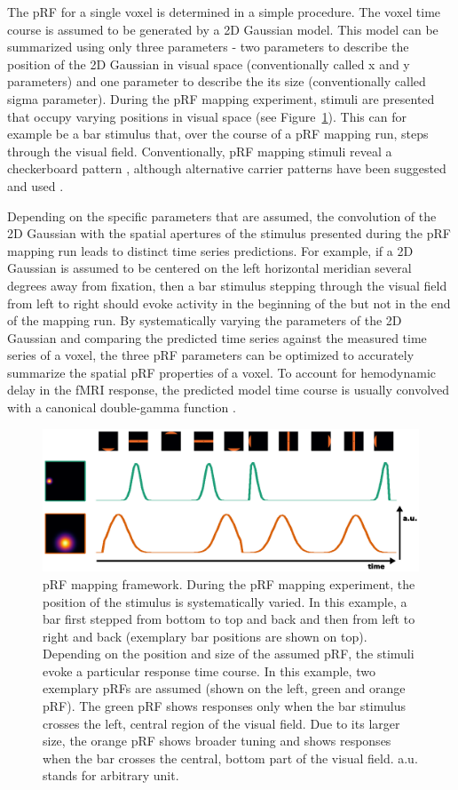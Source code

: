 The pRF for a single voxel is determined in a simple procedure. The voxel time course is assumed to be generated by a 2D Gaussian model. This model can be summarized using only three parameters - two parameters to describe the position of the 2D Gaussian in visual space (conventionally called x and y parameters) and one parameter to describe the its size (conventionally called sigma parameter). During the pRF mapping experiment, stimuli are presented that occupy varying positions in visual space (see Figure~\ref{fig:prf}). This can for example be a bar stimulus that, over the course of a pRF mapping run, steps through the visual field. Conventionally, pRF mapping stimuli reveal a checkerboard pattern \parencite{Dumoulin2008}, although alternative carrier patterns have been suggested and used \parencite{Alvarez2015}.

Depending on the specific parameters that are assumed, the convolution of the 2D Gaussian with the spatial apertures of the stimulus presented during the pRF mapping run leads to distinct time series predictions. For example, if a 2D Gaussian is assumed to be centered on the left horizontal meridian several degrees away from fixation, then a bar stimulus stepping through the visual field from left to right should evoke activity in the beginning of the but not in the end of the mapping run. By systematically varying the parameters of the 2D Gaussian and comparing the predicted time series against the measured time series of a voxel, the three pRF parameters can be optimized to accurately summarize the spatial pRF properties of a voxel. To account for hemodynamic delay in the fMRI response, the predicted model time course is usually convolved with a canonical double-gamma function \parencite{Friston1998}.

\begin{figure}[!htb]
\centering
\includegraphics[width=\textwidth]{figures/chapter_01/fig2.eps}
\caption{pRF mapping framework. During the pRF mapping experiment, the position of the stimulus is systematically varied. In this example, a bar first stepped from bottom to top and back and then from left to right and back (exemplary bar positions are shown on top). Depending on the position and size of the assumed pRF, the stimuli evoke a particular response time course. In this example, two exemplary pRFs are assumed (shown on the left, green and orange pRF). The green pRF shows responses only when the bar stimulus crosses the left, central region of the visual field. Due to its larger size, the orange pRF shows broader tuning and shows responses when the bar crosses the central, bottom part of the visual field. a.u. stands for arbitrary unit.}
\label{fig:prf} 
\end{figure}

